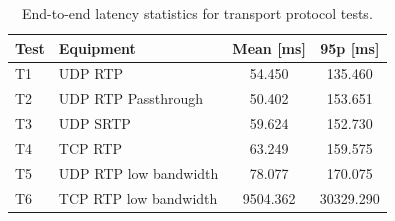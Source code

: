 \begin{table}[H]
    \centering
    \caption{End-to-end latency statistics for transport protocol tests.}\label{tab:end_transport_latency}
    \begin{tabular}{|l|l|c|c|}
    \hline
    \textbf{Test} & \textbf{Equipment} & \textbf{Mean [ms]} & \textbf{95p [ms]} \\
    \hline
    T1 & UDP RTP & 54.450 & 135.460\\
    \hline
    T2 & UDP RTP Passthrough & 50.402 & 153.651  \\
    \hline
    T3 & UDP SRTP & 59.624 & 152.730 \\
    \hline
    T4 & TCP RTP & 63.249 & 159.575  \\
    \hline
    T5 & UDP RTP low bandwidth & 78.077 & 170.075\\
    \hline
    T6 & TCP RTP low bandwidth & 9504.362 & 30329.290 \\
    \hline
    \end{tabular}
\end{table}

